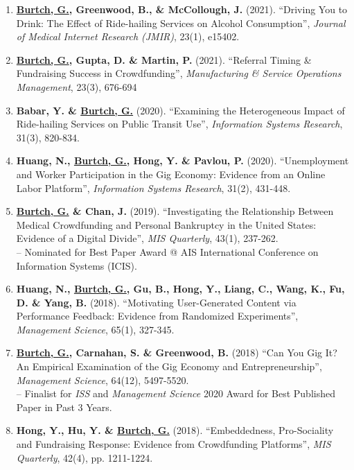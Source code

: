 \documentclass[10.5pt,letterpaper,sans]{moderncv}        %
\begin{document}
\begin{enumerate}[leftmargin=!,labelindent=5pt,itemindent=-15pt]
\item \textbf{\underline{Burtch, G.}, Greenwood, B., \& McCollough, J.} (2021). ``Driving You to Drink: The Effect of Ride-hailing Services on Alcohol Consumption'', \textit{Journal of Medical Internet Research (JMIR)}, 23(1), e15402.

\item \textbf{\underline{Burtch, G.}, Gupta, D. \& Martin, P.} (2021). ``Referral Timing \& Fundraising Success in Crowdfunding'', \textit{Manufacturing \& Service Operations Management}, 23(3), 676-694

\item \textbf{Babar, Y. \& \underline{Burtch, G.}} (2020). ``Examining the Heterogeneous Impact of Ride-hailing Services on Public Transit Use'', \textit{Information Systems Research}, 31(3), 820-834.

\item \textbf{Huang, N., \underline{Burtch, G.}, Hong, Y. \& Pavlou, P.} (2020). ``Unemployment and Worker Participation in the Gig Economy: Evidence from an Online Labor Platform'', \textit{Information Systems Research}, 31(2), 431-448.

\item \textbf{\underline{Burtch, G.} \& Chan, J.} (2019). ``Investigating the Relationship Between Medical Crowdfunding and Personal Bankruptcy in the United States: Evidence of a Digital Divide'', \textit{MIS Quarterly}, 43(1), 237-262. \\-- Nominated for Best Paper Award @ AIS International Conference on Information Systems (ICIS).

\item \textbf{Huang, N., \underline{Burtch, G.}, Gu, B., Hong, Y., Liang, C., Wang, K., Fu, D. \& Yang, B.} (2018). ``Motivating User-Generated Content via Performance Feedback: Evidence from Randomized Experiments'', \textit{Management Science}, 65(1), 327-345.

\item \textbf{\underline{Burtch, G.}, Carnahan, S. \& Greenwood, B.} (2018) ``Can You Gig It? An Empirical Examination of the Gig Economy and Entrepreneurship'', \textit{Management Science}, 64(12), 5497-5520. \\-- Finalist for \textit{ISS} and \textit{Management Science} 2020 Award for Best Published Paper in Past 3 Years.

\item \textbf{Hong, Y., Hu, Y. \& \underline{Burtch, G.}} (2018). ``Embeddedness, Pro-Sociality and Fundraising Response: Evidence from Crowdfunding Platforms'', \textit{MIS Quarterly}, 42(4), pp. 1211-1224.


\end{enumerate}
\end{document}
